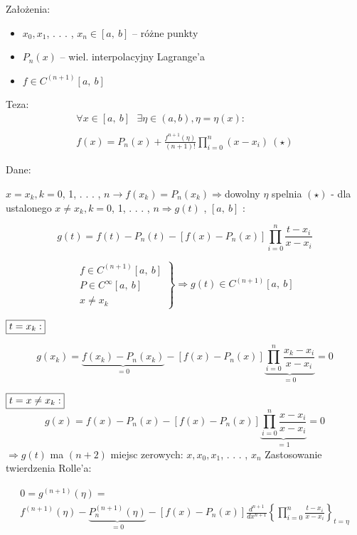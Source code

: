  \begin{frame}

Założenia:

\begin{itemize}
\item $x_{0}, x_{1}$, . . . , $x_{n}\in[a,\ b]$ -- różne punkty
\item $P_{n}(x)$ -- wiel. interpolacyjny Lagrange'a
\item $f\in C^{(n+1)}[a,\ b]$
\end{itemize}

\begin{block}
{Teza:}
\begin{gather*}
  \forall x \in[a,\ b] \text{ } \exists \eta \in (a, b), \eta = \eta(x): \\ \\
  f(x)=P_{n}(x)+\frac{f^{n+1}(\eta)}{(n+1)!}\prod_{i=0}^{n}(x-x_{i})\ (\star)
\end{gather*}
\end{block}

\end{frame}

\begin{frame}
Dane:

$x=x_{k}, k=0$, 1, . . . , $n \rightarrow f(x_{k})=P_{n}(x_{k})\Rightarrow$dowolny $\eta$ spelnia $(\star)$ \newline
- dla ustalonego $x\neq x_{k}, k=0$, 1, . . . , $n\Rightarrow g(t)$ , $[a,\ b]$ :

$$g(t)=f(t)-P_{n}(t)-[f(x)-P_{n}(x)]\prod_{i=0}^{n}\frac{t-x_{i}}{x-x_{i}}$$

$$
 \left. \begin{array}{ll}
f\in C^{(n+1)}[a,\ b] \\
P\in C^{\infty}[a,\ b]\\
x\neq x_{k}
\end{array} \right \} \Rightarrow g(t)\in C^{(n+1)}[a,\ b]
$$

$\fbox{$t=x_{k}:$}$

$$g(x_{k})=\underbrace{f(x_{k})-P_{n}(x_{k})}_{=0}-[f(x)-P_{n}(x)]\underbrace{\prod_{i=0}^{n}\frac{x_{k}-x_{i}}{x-x_{i}}}_{=0}=0$$

\end{frame}

\begin{frame}
$\fbox{$t=x \neq x_k:$}$
$$
g(x)=f(x)-P_{n}(x)-[f(x)-P_{n}(x)]\underbrace{\prod_{i=0}^{n}\frac{x-x_{i}}{x-x_{i}}}_{=1}=0
$$
$\Rightarrow g(t)$ ma $(n+2)$ miejsc zerowych: $x, x_{0}, x_{1}$, . . . , $x_{n}$ \newline \newline
Zastosowanie twierdzenia Rolle'a:


$$\begin{array}{ll}
0=g^{(n+1)}(\displaystyle \eta)= \\
f^{(n+1)}(\eta)-\underbrace{P_{n}^{(n+1)}(\eta)}_{=0}-[f(x)-P_{n}(x)]\frac{d^{n+1}}{dx^{n+1}} \left \{\prod_{i=0}^{n}\frac{t-x_{i}}{x-x_{i}} \right \}_{t=\eta}  \end{array}$$


 \end{frame}

